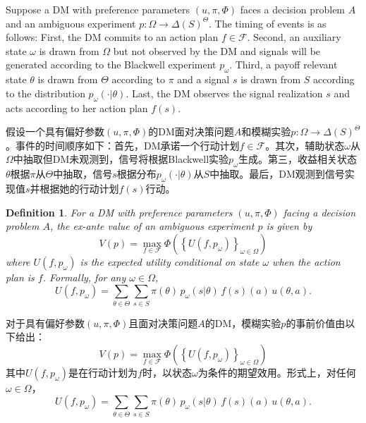 \documentclass[12pt,a4paper]{article}
\newenvironment{original}
  {\par\vspace{4pt}\noindent\color{black}\ignorespaces}
  {\par\vspace{2pt}}
\newenvironment{translation}
  {\par\vspace{2pt}\noindent\color{myblue}\ignorespaces}
  {\par\vspace{6pt}}
\newtheorem{definition}[theorem]{Definition}
\newcommand{\Delt}{\Delta}
\newcommand{\calF}{\mathcal{F}}
\begin{document}
\begin{original}
Suppose a DM with preference parameters $(u,\pi,\Phi)$ faces a decision problem $A$ and an ambiguous experiment $p:\Omega\to\Delt(S)^{\Theta}$. The timing of events is as follows: First, the DM commits to an action plan $f\in\calF$. Second, an auxiliary state $\omega$ is drawn from $\Omega$ but not observed by the DM and signals will be generated according to the Blackwell experiment $p_{\omega}$. Third, a payoff relevant state $\theta$ is drawn from $\Theta$ according to $\pi$ and a signal $s$ is drawn from $S$ according to the distribution $p_{\omega}(\cdot|\theta)$. Last, the DM observes the signal realization $s$ and acts according to her action plan $f(s)$.
\end{original}

\begin{translation}
假设一个具有偏好参数$(u,\pi,\Phi)$的DM面对决策问题$A$和模糊实验$p:\Omega\to\Delt(S)^{\Theta}$。事件的时间顺序如下：首先，DM承诺一个行动计划$f\in\calF$。其次，辅助状态$\omega$从$\Omega$中抽取但DM未观测到，信号将根据Blackwell实验$p_{\omega}$生成。第三，收益相关状态$\theta$根据$\pi$从$\Theta$中抽取，信号$s$根据分布$p_{\omega}(\cdot|\theta)$从$S$中抽取。最后，DM观测到信号实现值$s$并根据她的行动计划$f(s)$行动。
\end{translation}

\begin{definition}
For a DM with preference parameters $(u,\pi,\Phi)$ facing a decision problem $A$, the ex-ante value of an ambiguous experiment $p$ is given by
\begin{equation}
    V(p) = \max_{f\in\calF} \Phi\left( \left\{ U(f, p_{\omega}) \right\}_{\omega\in\Omega} \right) \label{eq:Vp}
\end{equation}
where $U(f, p_{\omega})$ is the expected utility conditional on state $\omega$ when the action plan is $f$. Formally, for any $\omega\in\Omega$,
\begin{equation}
    U(f, p_{\omega}) = \sum_{\theta\in\Theta}\sum_{s\in S} \pi(\theta)\, p_{\omega}(s|\theta)\, f(s)(a)\, u(\theta, a). \label{eq:Ufp}
\end{equation}
\end{definition}

\begin{translation}
对于具有偏好参数$(u,\pi,\Phi)$且面对决策问题$A$的DM，模糊实验$p$的事前价值由以下给出：
\begin{equation}
    V(p) = \max_{f\in\calF} \Phi\left( \left\{ U(f, p_{\omega}) \right\}_{\omega\in\Omega} \right) \label{eq:Vp}
\end{equation}
其中$U(f, p_{\omega})$是在行动计划为$f$时，以状态$\omega$为条件的期望效用。形式上，对任何$\omega\in\Omega$，
\begin{equation}
    U(f, p_{\omega}) = \sum_{\theta\in\Theta}\sum_{s\in S} \pi(\theta)\, p_{\omega}(s|\theta)\, f(s)(a)\, u(\theta, a). \label{eq:Ufp}
\end{equation}
\end{translation}
\end{document}
